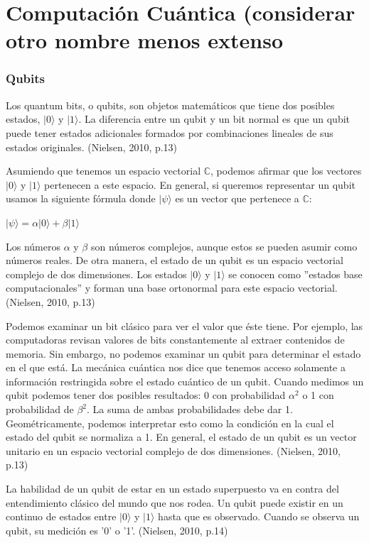 \documentclass[11pt,a4paper]{article}
\begin{document}
\part{Computación Cuántica (considerar otro nombre menos extenso}
\section*{Qubits}

Los quantum bits, o qubits, son objetos matemáticos que tiene dos posibles estados,  $\vert 0\rangle$ y $\vert 1\rangle$. La diferencia entre un qubit y un bit normal es que un qubit puede tener estados adicionales formados por combinaciones lineales de sus estados originales. (Nielsen, 2010, p.13)

Asumiendo que tenemos un espacio vectorial $\mathbb{C}$, podemos afirmar que los vectores $\vert 0\rangle$ y $\vert 1\rangle$ pertenecen a este espacio. En general, si queremos representar un qubit usamos la siguiente fórmula donde $\vert \psi \rangle$ es un vector que pertenece a $\mathbb{C}$:

\begin{center}
$\vert \psi \rangle = \alpha \vert 0\rangle + \beta \vert 1\rangle$
\end{center}

Los números $\alpha$ y $\beta$ son números complejos, aunque estos se pueden asumir como números reales. De otra manera, el estado de un qubit es un espacio vectorial complejo de dos dimensiones. Los estados $\vert 0\rangle$ y $\vert 1\rangle$ se conocen como ''estados base computacionales'' y forman una base ortonormal para este espacio vectorial. (Nielsen, 2010, p.13)

Podemos examinar un bit clásico para ver el valor que éste tiene. Por ejemplo, las computadoras revisan valores de bits constantemente al extraer contenidos de memoria. Sin embargo, no podemos examinar un qubit para determinar el estado en el que está. La mecánica cuántica nos dice que tenemos acceso solamente a información restringida sobre el estado cuántico de un qubit. Cuando medimos un qubit podemos tener dos posibles resultados: 0 con probabilidad $\alpha^2$ o 1 con probabilidad de $\beta^2$. La suma de ambas probabilidades debe dar 1. Geométricamente, podemos interpretar esto como la condición en la cual el estado del qubit se normaliza a 1. En general, el estado de un qubit es un vector unitario en un espacio vectorial complejo de dos dimensiones.  (Nielsen, 2010, p.13)

La habilidad de un qubit de estar en un estado superpuesto va en contra del entendimiento clásico del mundo que nos rodea. Un qubit puede existir en un continuo de estados entre $\vert 0\rangle$ y $\vert 1\rangle$ hasta que es observado. Cuando se observa un qubit, su medición es '0' o '1'. (Nielsen, 2010, p.14)
\end{document}
